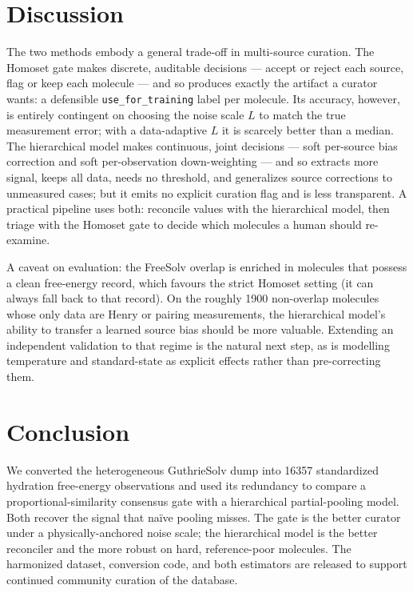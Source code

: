 \documentclass[11pt]{article}
\begin{document}
\section{Discussion}
The two methods embody a general trade-off in multi-source curation. The Homoset gate makes
discrete, auditable decisions --- accept or reject each source, flag or keep each molecule --- and
so produces exactly the artifact a curator wants: a defensible \texttt{use\_for\_training} label
per molecule. Its accuracy, however, is entirely contingent on choosing the noise scale $L$ to
match the true measurement error; with a data-adaptive $L$ it is scarcely better than a median.
The hierarchical model makes continuous, joint decisions --- soft per-source bias correction and
soft per-observation down-weighting --- and so extracts more signal, keeps all data, needs no
threshold, and generalizes source corrections to unmeasured cases; but it emits no explicit
curation flag and is less transparent. A practical pipeline uses both: reconcile values with the
hierarchical model, then triage with the Homoset gate to decide which molecules a human should
re-examine.

A caveat on evaluation: the FreeSolv overlap is enriched in molecules that possess a clean
free-energy record, which favours the strict Homoset setting (it can always fall back to that
record). On the roughly \num{1900} non-overlap molecules whose only data are Henry or pairing
measurements, the hierarchical model's ability to transfer a learned source bias should be more
valuable. Extending an independent validation to that regime is the natural next step, as is
modelling temperature and standard-state as explicit effects rather than pre-correcting them.

\section{Conclusion}
We converted the heterogeneous GuthrieSolv dump into \num{16357} standardized hydration
free-energy observations and used its redundancy to compare a proportional-similarity consensus
gate with a hierarchical partial-pooling model. Both recover the signal that naïve pooling
misses. The gate is the better curator under a physically-anchored noise scale; the hierarchical
model is the better reconciler and the more robust on hard, reference-poor molecules. The
harmonized dataset, conversion code, and both estimators are released to support continued
community curation of the database.
\end{document}
